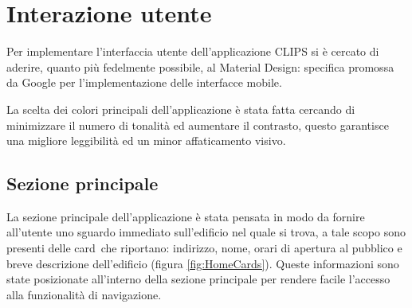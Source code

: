 \documentclass[../Sperimentazione.tex]{subfiles}
\begin{document}
	\section{Interazione utente}
		Per implementare l'interfaccia utente dell'applicazione CLIPS si è cercato di aderire, quanto più fedelmente possibile, al Material Design: specifica promossa da Google per l'implementazione delle interfacce mobile.
		
		La scelta dei colori principali dell'applicazione è stata fatta cercando di minimizzare il numero di tonalità ed aumentare il contrasto, questo garantisce una migliore leggibilità ed un minor affaticamento visivo.

		\subsection{Sezione principale}
			La sezione principale dell'applicazione è stata pensata in modo da fornire all'utente uno sguardo immediato sull'edificio nel quale si trova, a tale scopo sono presenti delle card\g\ che riportano: indirizzo, nome, orari di apertura al pubblico e breve descrizione dell'edificio (figura \ref{fig:HomeCards}). Queste informazioni sono state posizionate all'interno della sezione principale per rendere facile l'accesso alla funzionalità di navigazione. 
			
\end{document}
